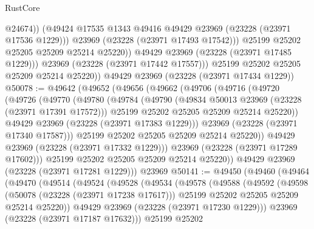 \begin{lexlean}{RustCore}
\begin{coremodule}
                      @24674))
                  (@49424 @17535 @1343 @49416 @49429 @23969 (@23228 (@23971 @17536 @1229)))
                  @23969
                  (@23228 (@23971 @17493 @17542)))
                @25199
                @25202
                @25205
                @25209
                @25214
                @25220))
            @49429
            @23969
            (@23228 (@23971 @17485 @1229)))
          @23969
          (@23228 (@23971 @17442 @17557)))
        @25199
        @25202
        @25205
        @25209
        @25214
        @25220))
    @49429
    @23969
    (@23228 (@23971 @17434 @1229))
@50078 := @49642
    (@49652
      (@49656
        (@49662
          (@49706
            (@49716
              (@49720
                (@49726
                  (@49770
                    (@49780
                      (@49784
                        (@49790
                          (@49834 @50013 @23969 (@23228 (@23971 @17391 @17572)))
                          @25199
                          @25202
                          @25205
                          @25209
                          @25214
                          @25220))
                      @49429
                      @23969
                      (@23228 (@23971 @17383 @1229)))
                    @23969
                    (@23228 (@23971 @17340 @17587)))
                  @25199
                  @25202
                  @25205
                  @25209
                  @25214
                  @25220))
              @49429
              @23969
              (@23228 (@23971 @17332 @1229)))
            @23969
            (@23228 (@23971 @17289 @17602)))
          @25199
          @25202
          @25205
          @25209
          @25214
          @25220))
      @49429
      @23969
      (@23228 (@23971 @17281 @1229)))
    @23969
@50141 := @49450
    (@49460
      (@49464
        (@49470
          (@49514
            (@49524
              (@49528
                (@49534
                  (@49578
                    (@49588
                      (@49592
                        (@49598
                          (@50078 (@23228 (@23971 @17238 @17617)))
                          @25199
                          @25202
                          @25205
                          @25209
                          @25214
                          @25220))
                      @49429
                      @23969
                      (@23228 (@23971 @17230 @1229)))
                    @23969
                    (@23228 (@23971 @17187 @17632)))
                  @25199
                  @25202

\end{coremodule}
\end{lexlean}
